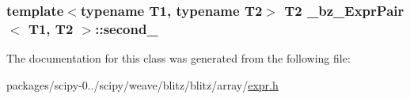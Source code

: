 \subsubsection[{second\+\_\+}]{\setlength{\rightskip}{0pt plus 5cm}template$<$typename T1, typename T2$>$ T2 {\bf \+\_\+bz\+\_\+\+Expr\+Pair}$<$ T1, T2 $>$\+::second\+\_\+\hspace{0.3cm}{\ttfamily [protected]}}\label{class__bz__ExprPair_ac6c2398f8ee4838612b7ba6b6c4618f8}


The documentation for this class was generated from the following file\+:\begin{DoxyCompactItemize}
\item 
packages/scipy-\/0../scipy/weave/blitz/blitz/array/\hyperlink{expr_8h}{expr.\+h}\end{DoxyCompactItemize}
